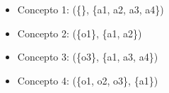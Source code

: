 \documentclass{beamer}
\begin{document}
{\begin{figure}[H]
\begin{minipage}{.4\textwidth}
\begin{table}[H]
    \end{table}
\end{minipage}%
\begin{minipage}{.6\textwidth}
  \centering
\begin{itemize}
    \item Concepto 1: (\{\}, \{a1, a2, a3, a4\}) 
    \item Concepto 2: (\{o1\}, \{a1, a2\}) 
    \item Concepto 3: (\{o3\}, \{a1, a3, a4\}) 
    \item Concepto 4: (\{o1, o2, o3\}, \{a1\}) 
\end{itemize}
\end{minipage}
\end{figure}
}

\end{document}
